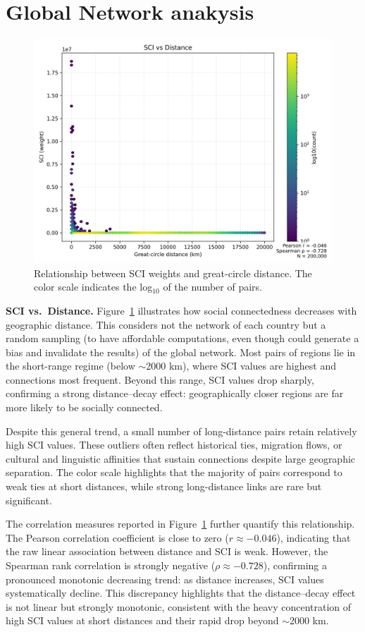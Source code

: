 \section{Global Network anakysis}
\begin{figure}[h!]
    \centering
    \includegraphics[width=0.65\linewidth]{images/TASK3/global_distance_vs_sci.png}
    \caption{Relationship between SCI weights and great-circle distance. The color scale indicates the log$_{10}$ of the number of pairs.}
    \label{fig:distance}
\end{figure}

\noindent \textbf{SCI vs.\ Distance.}  
Figure~\ref{fig:distance} illustrates how social connectedness decreases with geographic distance.
This considers not the network of each country but a random sampling (to have affordable computations, even though could generate a bias and invalidate the results) of the global network.
Most pairs of regions lie in the short-range regime (below $\sim$2000 km), where SCI values are highest and connections most frequent.  
Beyond this range, SCI values drop sharply, confirming a strong distance–decay effect: geographically closer regions are far more likely to be socially connected.  

\noindent Despite this general trend, a small number of long-distance pairs retain relatively high SCI values.  
These outliers often reflect historical ties, migration flows, or cultural and linguistic affinities that sustain connections despite large geographic separation.  
The color scale highlights that the majority of pairs correspond to weak ties at short distances, while strong long-distance links are rare but significant.  

\noindent The correlation measures reported in Figure~\ref{fig:distance} further quantify this relationship.  
The Pearson correlation coefficient is close to zero ($r \approx -0.046$), indicating that the raw linear association between distance and SCI is weak.  
However, the Spearman rank correlation is strongly negative ($\rho \approx -0.728$), confirming a pronounced monotonic decreasing trend: as distance increases, SCI values systematically decline.  
This discrepancy highlights that the distance–decay effect is not linear but strongly monotonic, consistent with the heavy concentration of high SCI values at short distances and their rapid drop beyond $\sim$2000 km.  
